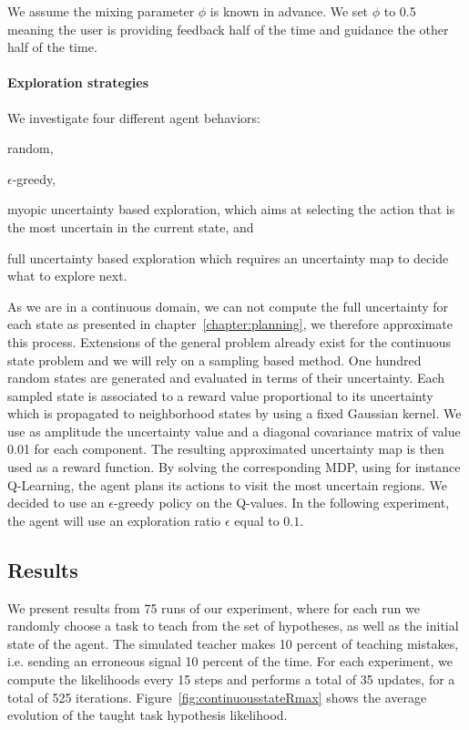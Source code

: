 We assume the mixing parameter $\phi$ is known in advance. We set $\phi$ to 0.5 meaning the user is providing feedback half of the time and guidance the other half of the time. 

\paragraph{Exploration strategies}

We investigate four different agent behaviors: \begin{inparaenum}[a)] \item random, \item $\epsilon$-greedy, \item myopic uncertainty based exploration, which aims at selecting the action that is the most uncertain in the current state, and \item full uncertainty based exploration which requires an uncertainty map to decide what to explore next. \end{inparaenum} 

As we are in a continuous domain, we can not compute the full uncertainty for each state as presented in chapter~\ref{chapter:planning}, we therefore approximate this process. Extensions of the general problem already exist for the continuous state problem \cite{nouri2010dimension,Hester13aamas} and we will rely on a sampling based method. One hundred random states are generated and evaluated in terms of their uncertainty. Each sampled state is associated to a reward value proportional to its uncertainty which is propagated to neighborhood states by using a fixed Gaussian kernel. We use as amplitude the uncertainty value and a diagonal covariance matrix of value 0.01 for each component. The resulting approximated uncertainty map is then used as a reward function. By solving the corresponding MDP, using for instance Q-Learning, the agent plans its actions to visit the most uncertain regions. We decided to use an $\epsilon$-greedy policy on the Q-values. In the following experiment, the agent will use an exploration ratio $\epsilon$ equal to $0.1$.

\subsection{Results}

We present results from 75 runs of our experiment, where for each run we randomly choose a task to teach from the set of hypotheses, as well as the initial state of the agent. The simulated teacher makes 10 percent of teaching mistakes, i.e. sending an erroneous signal 10 percent of the time. For each experiment, we compute the likelihoods every 15 steps and performs a total of 35 updates, for a total of 525 iterations. Figure~\ref{fig:continuousstateRmax} shows the average evolution of the taught task hypothesis likelihood.

